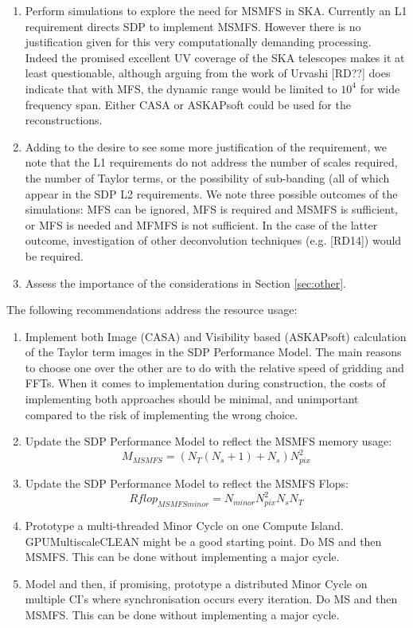 \documentclass[11pt,a4paper,variablewidth]{article}
\begin{document}
\begin{enumerate}
\item Perform simulations to explore the need for MSMFS in SKA. Currently an L1 requirement directs SDP to implement MSMFS. However there is no justification given for this very computationally demanding processing. Indeed the promised excellent UV coverage of the SKA telescopes makes it at least questionable, although arguing from the work of Urvashi [RD??] does indicate that with MFS, the dynamic range would be limited to $10^4$ for wide frequency span. Either CASA or ASKAPsoft could be used for the reconstructions.
\item Adding to the desire to see some more justification of the requirement, we note that the L1 requirements do not address the number of scales required, the number of Taylor terms, or the possibility of sub-banding (all of which appear in the SDP L2 requirements. We note three possible outcomes of the simulations: MFS can be ignored, MFS is required and MSMFS is sufficient, or MFS is needed and MFMFS is not sufficient. In the case of the latter outcome, investigation of other deconvolution techniques (e.g. [RD14]) would be required.
\item Assess the importance of the considerations in Section \ref{sec:other}.
\end{enumerate}

The following recommendations address the resource usage:
\begin{enumerate}[resume]
\item Implement both Image (CASA) and Visibility based (ASKAPsoft) calculation of the Taylor term images in the SDP Performance Model. The main reasons to choose one over the other are to do with the relative speed of gridding and FFTs. When it comes to implementation during construction, the costs of implementing both approaches should be minimal, and unimportant compared to the risk of implementing the wrong choice.
\item Update the SDP Performance Model to reflect the MSMFS memory usage:
\begin{equation}
M_{MSMFS} = (N_T (N_s + 1) + N_s) N_{pix}^2 
\end{equation}
\item Update the SDP Performance Model to reflect the MSMFS Flops:
\begin{equation}
Rflop_{MSMFSminor} = N_{minor} N_{pix}^2 N_s N_T	
\end{equation}
\item Prototype a multi-threaded Minor Cycle on one Compute Island. GPUMultiscaleCLEAN might be a good starting point. Do MS and then MSMFS. This can be done without implementing a major cycle.
\item Model and then, if promising, prototype a distributed Minor Cycle on multiple CI's where synchronisation occurs every iteration. Do MS and then MSMFS. This can be done without implementing a major cycle.\end{enumerate}
\end{document}
